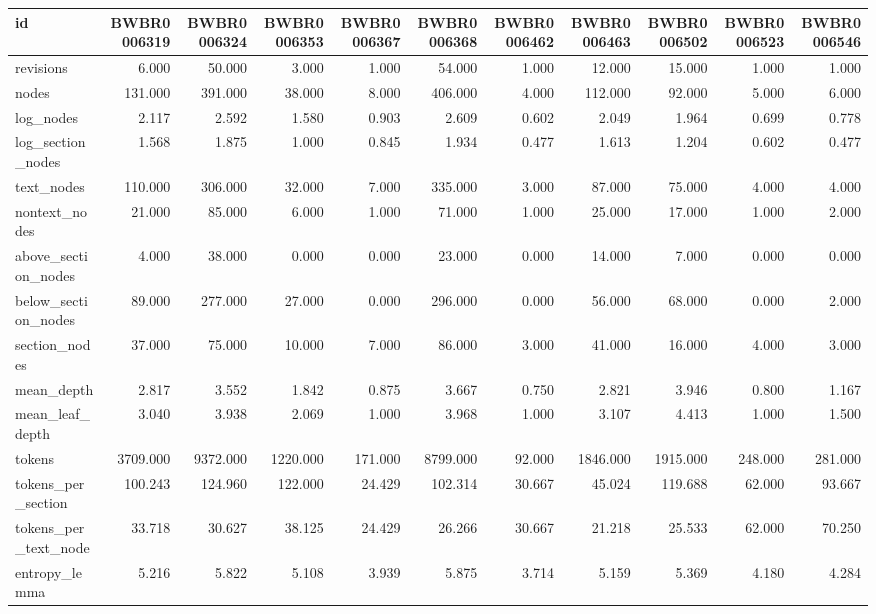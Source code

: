 \begin{tabular}{lrrrrrrrrrr}
\toprule
id & BWBR0006319 & BWBR0006324 & BWBR0006353 & BWBR0006367 & BWBR0006368 & BWBR0006462 & BWBR0006463 & BWBR0006502 & BWBR0006523 & BWBR0006546 \\
\midrule
revisions & 6.000 & 50.000 & 3.000 & 1.000 & 54.000 & 1.000 & 12.000 & 15.000 & 1.000 & 1.000 \\
\cline{1-11}
nodes & 131.000 & 391.000 & 38.000 & 8.000 & 406.000 & 4.000 & 112.000 & 92.000 & 5.000 & 6.000 \\
\cline{1-11}
log\_nodes & 2.117 & 2.592 & 1.580 & 0.903 & 2.609 & 0.602 & 2.049 & 1.964 & 0.699 & 0.778 \\
\cline{1-11}
log\_section\_nodes & 1.568 & 1.875 & 1.000 & 0.845 & 1.934 & 0.477 & 1.613 & 1.204 & 0.602 & 0.477 \\
\cline{1-11}
text\_nodes & 110.000 & 306.000 & 32.000 & 7.000 & 335.000 & 3.000 & 87.000 & 75.000 & 4.000 & 4.000 \\
\cline{1-11}
nontext\_nodes & 21.000 & 85.000 & 6.000 & 1.000 & 71.000 & 1.000 & 25.000 & 17.000 & 1.000 & 2.000 \\
\cline{1-11}
above\_section\_nodes & 4.000 & 38.000 & 0.000 & 0.000 & 23.000 & 0.000 & 14.000 & 7.000 & 0.000 & 0.000 \\
\cline{1-11}
below\_section\_nodes & 89.000 & 277.000 & 27.000 & 0.000 & 296.000 & 0.000 & 56.000 & 68.000 & 0.000 & 2.000 \\
\cline{1-11}
section\_nodes & 37.000 & 75.000 & 10.000 & 7.000 & 86.000 & 3.000 & 41.000 & 16.000 & 4.000 & 3.000 \\
\cline{1-11}
mean\_depth & 2.817 & 3.552 & 1.842 & 0.875 & 3.667 & 0.750 & 2.821 & 3.946 & 0.800 & 1.167 \\
\cline{1-11}
mean\_leaf\_depth & 3.040 & 3.938 & 2.069 & 1.000 & 3.968 & 1.000 & 3.107 & 4.413 & 1.000 & 1.500 \\
\cline{1-11}
tokens & 3709.000 & 9372.000 & 1220.000 & 171.000 & 8799.000 & 92.000 & 1846.000 & 1915.000 & 248.000 & 281.000 \\
\cline{1-11}
tokens\_per\_section & 100.243 & 124.960 & 122.000 & 24.429 & 102.314 & 30.667 & 45.024 & 119.688 & 62.000 & 93.667 \\
\cline{1-11}
tokens\_per\_text\_node & 33.718 & 30.627 & 38.125 & 24.429 & 26.266 & 30.667 & 21.218 & 25.533 & 62.000 & 70.250 \\
\cline{1-11}
entropy\_lemma & 5.216 & 5.822 & 5.108 & 3.939 & 5.875 & 3.714 & 5.159 & 5.369 & 4.180 & 4.284 \\

\end{tabular}
